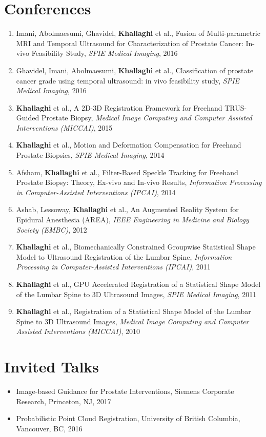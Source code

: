 \documentclass[letterpaper,11pt]{article}
\newcommand{\reviewItem}[1]{
  \item\small{#1 \vspace{-2pt}}
}
\newcommand{\publicationItem}[4]{
  \item\small{
    {#1}{ et al., #2\vspace{-2pt}}{, \textit{#3}\vspace{-2pt}}{, #4\vspace{-2pt}}
  }
}
\newcommand{\publicationSubheadingListStart}{\begin{enumerate}[leftmargin=*]}
\newcommand{\publicationSubheadingListEnd}{\end{enumerate}}
\newcommand{\publicationSubItem}[4]{\publicationItem{#1}{#2}{#3}{#4}\vspace{-4pt}}
\newcommand{\resumeSubHeadingListStart}{\begin{itemize}[leftmargin=*]}
\newcommand{\resumeSubHeadingListEnd}{\end{itemize}}
\begin{document}
\section{Conferences}
  \publicationSubheadingListStart
    \publicationSubItem{Imani, Abolmaesumi, Ghavidel, \textbf{Khallaghi}}
      {Fusion of Multi-parametric MRI and Temporal Ultrasound for Characterization of Prostate Cancer: In-vivo Feasibility Study}
      {SPIE Medical Imaging}{2016}
    \publicationSubItem{Ghavidel, Imani, Abolmaesumi, \textbf{Khallaghi}}
      {Classification of prostate cancer grade using temporal ultrasound: in vivo feasibility study}
      {SPIE Medical Imaging}{2016}
    \publicationSubItem{\textbf{Khallaghi}}
      {A 2D-3D Registration Framework for Freehand TRUS-Guided Prostate Biopsy}
      {Medical Image Computing and Computer Assisted Interventions (MICCAI)}{2015}
    \publicationSubItem{\textbf{Khallaghi}}
      {Motion and Deformation Compensation for Freehand Prostate Biopsies}
      {SPIE Medical Imaging}{2014}
    \publicationSubItem{Afsham, \textbf{Khallaghi}}
      {Filter-Based Speckle Tracking for Freehand Prostate Biopsy: Theory, Ex-vivo and In-vivo Results}
      {Information Processing in Computer-Assisted Interventions (IPCAI)}{2014}
    \publicationSubItem{Ashab, Lessoway, \textbf{Khallaghi}}
      {An Augmented Reality System for Epidural Anesthesia (AREA)}
      {IEEE Engineering in Medicine and Biology Society (EMBC)}{2012}
    \publicationSubItem{\textbf{Khallaghi}}
      {Biomechanically Constrained Groupwise Statistical Shape Model to Ultrasound Registration of the Lumbar Spine}
      {Information Processing in Computer-Assisted Interventions (IPCAI)}{2011}
    \publicationSubItem{\textbf{Khallaghi}}
      {GPU Accelerated Registration of a Statistical Shape Model of the Lumbar Spine to 3D Ultrasound Images}
      {SPIE Medical Imaging}{2011}
    \publicationSubItem{\textbf{Khallaghi}}
      {Registration of a Statistical Shape Model of the Lumbar Spine to 3D Ultrasound Images}
      {Medical Image Computing and Computer Assisted Interventions (MICCAI)}{2010}
  \publicationSubheadingListEnd

\section{Invited Talks}
  \resumeSubHeadingListStart
    \reviewItem{Image-based Guidance for Prostate Interventions, Siemens Corporate Research, Princeton, NJ, 2017}
    \reviewItem{Probabilistic Point Cloud Registration, University of British Columbia, Vancouver, BC, 2016}
  \resumeSubHeadingListEnd
\end{document}
